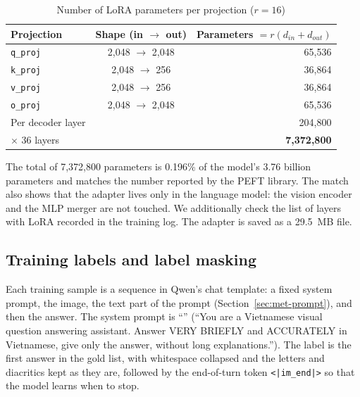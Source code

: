\begin{table}[htbp]
\caption{Number of LoRA parameters per projection ($r = 16$)}
\label{tab:met-params}
\centering
\small
\begin{tabular}{lcr}
\toprule
\textbf{Projection} & \textbf{Shape (in $\to$ out)} & \textbf{Parameters $= r(d_{in}+d_{out})$} \\
\midrule
\texttt{q\_proj} & 2,048 $\to$ 2,048 & 65,536 \\
\texttt{k\_proj} & 2,048 $\to$ 256 & 36,864 \\
\texttt{v\_proj} & 2,048 $\to$ 256 & 36,864 \\
\texttt{o\_proj} & 2,048 $\to$ 2,048 & 65,536 \\
\midrule
Per decoder layer & & 204,800 \\
$\times$ 36 layers & & \textbf{7,372,800} \\
\bottomrule
\end{tabular}
\end{table}

The total of 7,372,800 parameters is 0.196\% of the model's 3.76 billion parameters and
matches the number reported by the PEFT library. The match also shows that the adapter
lives only in the language model: the vision encoder and the MLP merger are not touched.
We additionally check the list of layers with LoRA recorded in the training log.
The adapter is saved as a 29.5~MB file.

\subsection{Training labels and label masking}
\label{sec:met-labels}

Each training sample is a sequence in Qwen's chat template: a fixed system prompt, the
image, the text part of the prompt (Section~\ref{sec:met-prompt}), and then the answer.
The system prompt is ``''
(``You are a Vietnamese visual question answering assistant. Answer VERY BRIEFLY and
ACCURATELY in Vietnamese, give only the answer, without long explanations.''). The label
is the first answer in the gold list, with whitespace collapsed and the letters and
diacritics kept as they are, followed by the end-of-turn token \texttt{<|im\_end|>} so
that the model learns when to stop.

